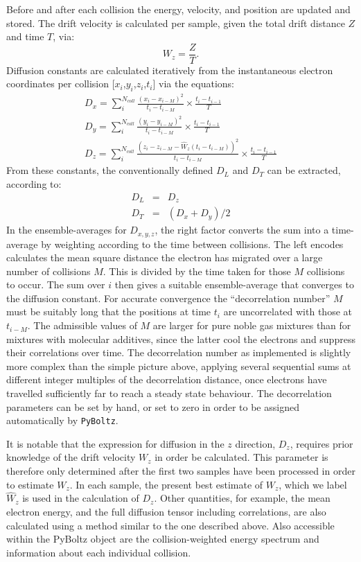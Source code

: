 \documentclass[3p,11pt]{elsarticle}
\begin{document}
Before and after each collision the energy, velocity, and position are updated and stored. The drift velocity is calculated per sample, given the total drift distance $Z$ and time $T$, via:
\begin{equation}
W_z = \frac{Z}{T}.
\end{equation}
Diffusion constants are calculated iteratively from the instantaneous electron coordinates per collision [$x_i$,$y_i$,$z_i$,$t_i$] via the equations:
\begin{eqnarray}
D_x = \sum _i^{N_{coll}} \frac{(x_i - x_{i-M})^2} {t_i -t_{i-M}} \times \frac {t_i - t_{i-1}}{T}\\
D_y = \sum _i^{N_{coll}} \frac{(y_i - y_{i-M})^2} {t_i -t_{i-M}} \times \frac {t_i - t_{i-1}}{T}\\
D_z = \sum _i^{N_{coll}} \frac{(z_i - z_{i-M} - \hat{W}_z (t_i -t_{i-M}))^2}{t_i -t_{i-M}} \times \frac {t_i - t_{i-1}}{T}
\end{eqnarray}
From these constants, the conventionally defined $D_L$ and $D_T$ can be extracted, according to:
\begin{eqnarray}
D_L & = & D_z\\
D_T & = & (D_x+D_y)/2
\end{eqnarray}
In the ensemble-averages for $D_{x,y,z}$, the right factor converts the sum into a time-average by weighting according to the time between collisions.  The left encodes calculates the mean square distance the electron has migrated over a large number of collisions $M$. This is divided by the time taken for those $M$ collisions to occur. The sum over $i$ then gives a suitable ensemble-average that converges to the diffusion constant.  For accurate convergence the ``decorrelation number'' $M$ must be suitably long that the positions at time $t_i$ are uncorrelated with those at $t_{i-M}$.  The admissible values of $M$ are larger for pure noble gas mixtures than for mixtures with molecular additives, since the latter cool the electrons and suppress their correlations over time.  The decorrelation number as implemented is slightly more complex than the simple picture above, applying several sequential sums at different integer multiples of the  decorrelation distance, once electrons have travelled sufficiently far to reach a steady state behaviour.  The decorrelation parameters can be set by hand, or set to zero in order to be assigned automatically by {\tt PyBoltz}.

It is notable that the expression for diffusion in the $z$ direction, $D_z$, requires prior knowledge of the drift velocity $W_z$ in order be calculated.  This parameter is therefore only determined after the first two samples have been processed in order to estimate $W_z$.  In each sample, the present best estimate of $W_z$, which we label $\hat{W}_z$ is used in the calculation of $D_z$.  Other quantities, for example, the mean electron energy, and the full diffusion tensor including correlations, are also calculated using a method similar to the one described above.  Also accessible within the PyBoltz object are the collision-weighted energy spectrum and information about each individual collision.
\end{document}
